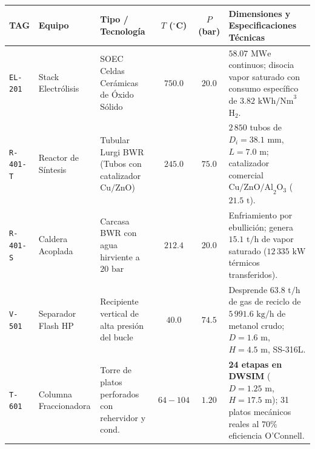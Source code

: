 \documentclass[10pt,landscape]{article}
\begin{document}
\scriptsize
\renewcommand{\arraystretch}{1.20}
\begin{tabularx}{\textwidth}{l p{2.4cm} p{2.8cm} c c X}
  \toprule
  \rowcolor{tableheader}
  \textbf{\color{white}TAG} & \textbf{\color{white}Equipo} & \textbf{\color{white}Tipo / Tecnología} & \textbf{\color{white}$T$ ($^\circ$C)} & \textbf{\color{white}$P$ (bar)} & \textbf{\color{white}Dimensiones y Especificaciones Técnicas} \\
  \midrule
  \rowcolor{roweven}
  \texttt{EL-201} & Stack Electrólisis & SOEC Celdas Cerámicas de Óxido Sólido & $750.0$ & $20.0$ & $58.07\text{ MWe}$ continuos; disocia vapor saturado con consumo específico de $3.82\text{ kWh/Nm}^3$ $\text{H}_2$. \\
  \rowcolor{rowodd}
  \texttt{R-401-T} & Reactor de Síntesis & Tubular Lurgi BWR (Tubos con catalizador $\text{Cu/ZnO}$) & $245.0$ & $75.0$ & $2\,850$ tubos de $D_i = 38.1\text{ mm}$, $L = 7.0\text{ m}$; catalizador comercial $\text{Cu/ZnO/Al}_2\text{O}_3$ ($21.5\text{ t}$). \\
  \rowcolor{roweven}
  \texttt{R-401-S} & Caldera Acoplada & Carcasa BWR con agua hirviente a $20\text{ bar}$ & $212.4$ & $20.0$ & Enfriamiento por ebullición; genera $15.1\text{ t/h}$ de vapor saturado ($12\,335\text{ kW}$ térmicos transferidos). \\
  \rowcolor{rowodd}
  \texttt{V-501} & Separador Flash HP & Recipiente vertical de alta presión del bucle & $40.0$ & $74.5$ & Desprende $63.8\text{ t/h}$ de gas de reciclo de $5\,991.6\text{ kg/h}$ de metanol crudo; $D=1.6\text{ m}$, $H=4.5\text{ m}$, SS-316L. \\
  \rowcolor{roweven}
  \texttt{T-601} & Columna Fraccionadora & Torre de platos perforados con rehervidor y cond. & $64 - 104$ & $1.20$ & \textbf{24 etapas en DWSIM} ($D = 1.25\text{ m}$, $H = 17.5\text{ m}$); 31 platos mecánicos reales al $70\%$ eficiencia O'Connell. \\
  \bottomrule
\end{tabularx}

\vspace{3pt}
\end{document}
